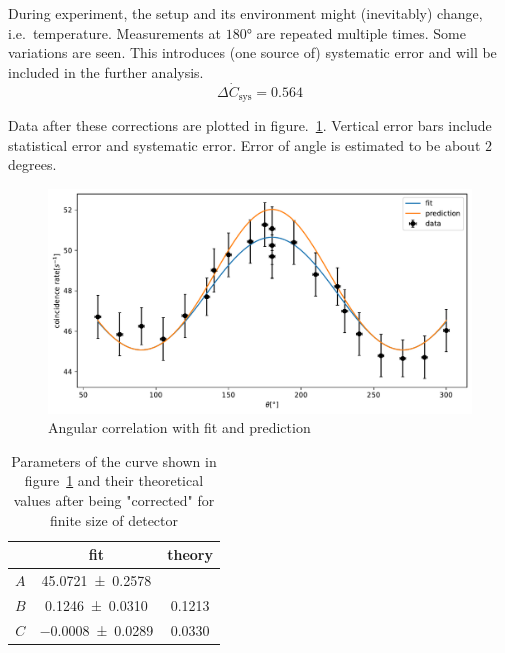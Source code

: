 During experiment, the setup and its environment might (inevitably) change, i.e.~temperature. Measurements at $180$° are repeated multiple times. Some variations are seen. This introduces (one source of) systematic error and will be included in the further analysis.
\begin{equation}
   \Delta \dot{C}_\text{sys} = \num{0.564}
\end{equation}

Data after these corrections are plotted in figure.~\ref{fig:angCor}. Vertical error bars include statistical error and systematic error. Error of angle is estimated to be about $2$ degrees.
\begin{figure}[ht]
   \centering
   \includegraphics[width=0.8\linewidth]{./figs/angCor.pdf}
   \caption{Angular correlation with fit and prediction}%
   \label{fig:angCor}
\end{figure}

\begin{table}[ht]
   \centering
   \begin{tabular}{ccc}
      \toprule
   & fit & theory \\
      \midrule
      $A$ &\num{45.0721 +- 0.2578} &   \\
      $B$ & \num{0.1246 +- 0.0310} & \num{0.1213}\\
      $C$ &\num{-0.0008 +- 0.0289} & \num{0.0330}\\
      \bottomrule
   \end{tabular}
   \caption{Parameters of the curve shown in figure~\ref{fig:angCor} and their theoretical values after being "corrected" for finite size of detector}
   \label{tab:ABC}
\end{table}


